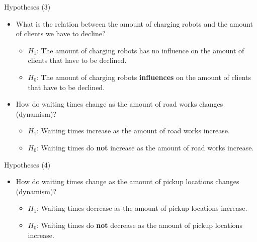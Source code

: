 \begin{frame}{Hypotheses (3)}
    \begin{itemize}
        \setlength\itemsep{1.5em}

        \item What is the relation between the amount of charging robots and the amount of clients we have to decline?
            \begin{itemize}
                \item $H_1$: The amount of charging robots has no influence on the amount of clients that have to be declined.
                \item $H_0$: The amount of charging robots \textbf{influences} on the amount of clients that have to be declined.
            \end{itemize}

            \item How do waiting times change as the amount of road works changes (dynamism)?
                \begin{itemize}
                    \item $H_1$: Waiting times increase as the amount of road works increase.
                    \item $H_0$: Waiting times do \textbf{not} increase as the amount of road works increase.
                \end{itemize}
    \end{itemize}
\end{frame}

\begin{frame}{Hypotheses (4)}
    \begin{itemize}
        \setlength\itemsep{1.5em}

        \item How do waiting times change as the amount of pickup locations changes (dynamism)?
            \begin{itemize}
                \item $H_1$: Waiting times decrease as the amount of pickup locations increase.
                \item $H_0$: Waiting times do \textbf{not} decrease as the amount of pickup locations increase.
            \end{itemize}
    \end{itemize}
\end{frame}
